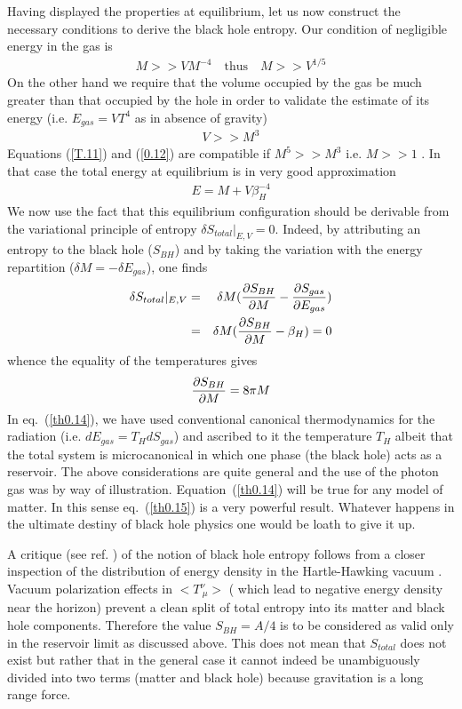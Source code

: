 \documentclass[12pt,oneside]{report}
\begin{document}
Having displayed the properties at equilibrium, let us now 
construct the necessary conditions to  derive
the black hole entropy.
Our condition of negligible energy in the gas is 
\begin{eqnarray}
M >>V M^{-4} \quad \mbox{thus} \quad
M >> V^{1/5}
\label {T.11}
\end{eqnarray}
On the other hand we require that the volume occupied by the gas
be much greater than that occupied by the hole in order to validate
the estimate of its energy (i.e. $E_{gas} = V T^4$ as in absence of gravity) 
\begin{eqnarray}
V >> M ^3 
\label {0.12}
\end{eqnarray}
Equations (\ref{T.11}) and  (\ref {0.12}) are compatible if $ M^5 >> M^3 $ i.e.
$ M >> 1 $ . In that case the total energy at equilibrium is in very good
approximation 
\begin{eqnarray}
E = M + V \beta^{-4}_{H} \label {0.13}
\end{eqnarray}
We now use the fact that this equilibrium configuration should be derivable
from the variational principle of entropy 
$\delta S_{total} \vert_{E,V} = 0$. Indeed, by attributing an entropy
to the black hole ($S_{BH}$) and by taking the variation with the
energy repartition ($\delta M = - \delta E_{gas}$), one finds
\begin{eqnarray}
 \delta S_{total} \vert_{E,V}  &=& \delta M
 ({\partial S_{BH} \over \partial M} -
{\partial S_{gas} \over \partial E_{gas}} ) \nonumber\\ &=&
 \delta M
 ({\partial S_{BH} \over
\partial M} - \beta_H) = 0 
\label{th0.14} 
\end{eqnarray}
 whence the equality of the temperatures gives
\begin{eqnarray}
 {\partial S_{BH} \over \partial M} = 8 \pi M 
\label{th0.15}
\end{eqnarray}
In eq.~(\ref{th0.14}), we have used conventional 
canonical thermodynamics for the radiation (i.e. $dE_{gas} = T_H dS_{gas}$) 
and ascribed to it the temperature $T_H$ albeit that the total system
is microcanonical in which one phase (the black hole) acts as a reservoir. 
The above considerations are quite general and the use of
the photon gas was by way of illustration. Equation~(\ref{th0.14}) will be
true for any model of matter.
In this sense eq.~(\ref{th0.15}) is a very powerful result. Whatever
happens in the ultimate destiny of black hole physics one would be
loath to give it up. 

A critique (see ref. \cite{PKO}) of the notion of black hole entropy follows from a
closer inspection of the distribution of energy density in the 
Hartle-Hawking vacuum \cite{How}. 
Vacuum polarization effects in $ < T_{\ \mu} ^{\nu}
> $ ( which lead to negative energy density near the horizon) prevent a
clean split of total entropy into its matter and black hole components.
Therefore the value $ S_{BH} = A / 4 $ is to be considered as valid only
in the reservoir limit as discussed above. This does not mean that $
S_{total} $ does not exist but rather that in the general case
it cannot indeed be unambiguously divided into two terms (matter and
black hole) because gravitation is a long range force.
\end{document}
